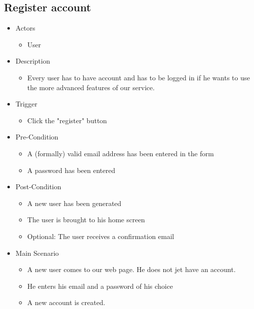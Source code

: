 \documentclass[a4paper,11pt]{article}
\begin{document}
\subsection*{Register account}
\begin{itemize}
	\item Actors
		\begin{itemize}
			\item User
		\end{itemize}
	\item Description
		\begin{itemize}
			\item Every user has to have account and has to be logged in if he wants to use the more advanced features of our service.
		\end{itemize}
	\item Trigger
		\begin{itemize}
			\item Click the "register" button
		\end{itemize}
	\item Pre-Condition
		\begin{itemize}
			\item A (formally) valid email address has been entered in the form
			\item A password has been entered 
		\end{itemize}
	\item Post-Condition
		\begin{itemize}
			\item A new user has been generated
			\item The user is brought to his home screen
			\item Optional: The user receives a confirmation email
		\end{itemize}
	\item Main Scenario
		\begin{itemize}
			\item A new user comes to our web page. He does not jet have an account.
			\item He enters his email and a password of his choice
			\item A new account is created.
		\end{itemize}
\end{itemize}
\end{document}
